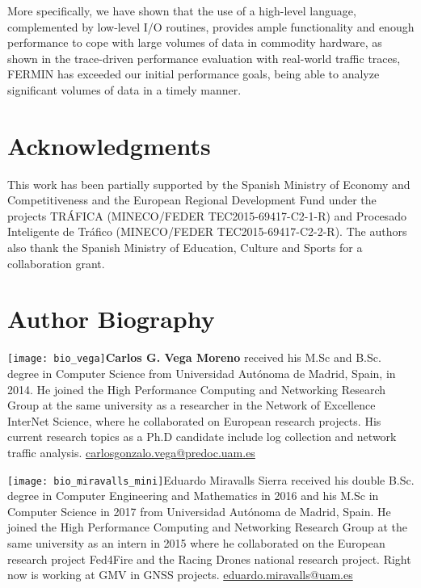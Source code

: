 \documentclass[AMA,STIX1COL]{WileyNJD-v2}
\begin{document}
More specifically, we have shown that the use of a high-level language, complemented by low-level I/O routines, provides ample functionality and enough performance to cope with large volumes of data in commodity hardware, as shown in the trace-driven performance evaluation with real-world traffic traces, FERMIN has exceeded our initial performance goals, being able to analyze significant volumes of data in a timely manner.


\section*{Acknowledgments}
This work has been partially supported by the Spanish Ministry of Economy and Competitiveness and the European Regional Development Fund under the projects TR\'AFICA (MINECO/FEDER TEC2015-69417-C2-1-R) and Procesado Inteligente de Tr\'afico (MINECO/FEDER TEC2015-69417-C2-2-R). The authors also thank the Spanish Ministry of Education, Culture and Sports for a collaboration grant.

%

\clearpage

\section*{Author Biography}

\begin{biography}{\texttt{[image: bio\_vega]}}{\textbf{Carlos G. Vega Moreno} received his M.Sc and B.Sc. degree in Computer Science from Universidad Aut\'onoma de Madrid, Spain, in 2014. He joined the High Performance Computing and Networking Research Group at the same university as a researcher in the Network of Excellence InterNet Science, where he collaborated on European research projects. His current research topics as a Ph.D candidate include log collection and network traffic analysis.}
\hfill \href{mailto:carlosgonzalo.vega@predoc.uam.es}{carlosgonzalo.vega@predoc.uam.es}
\end{biography}

\begin{biography}{\texttt{[image: bio\_miravalls\_mini]}}{{Eduardo Miravalls Sierra} received his double B.Sc. degree in Computer Engineering and Mathematics in 2016 and his M.Sc in Computer Science in 2017 from Universidad Aut\'onoma de Madrid, Spain. He joined the High Performance Computing and Networking Research Group at the same university as an intern in 2015 where he collaborated on the European research project Fed4Fire and the Racing Drones national research project. Right now is working at GMV in GNSS projects.}
\hfill \href{mailto:eduardo.miravalls@uam.es}{eduardo.miravalls@uam.es}
\end{biography}
\end{document}
